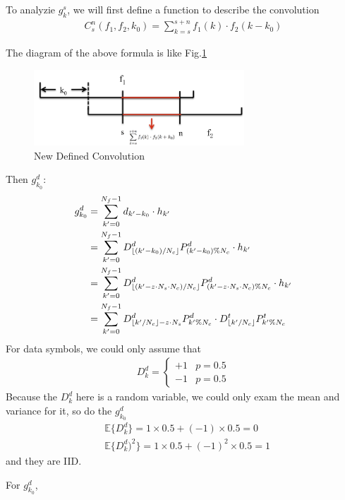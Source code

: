 \documentclass[a4paper]{article}
\DeclarePairedDelimiter\floor{\lfloor}{\rfloor}
\begin{document}
To analyzie $g^s_k$, we will first define a function to describe the convolution
\begin{align}
	C^n_s(f_1, f_2, k_0) = \sum_{k = s}^{s+n} f_1(k)\cdot f_2(k - k_0) \label{eq:New Defined Convolution}
\end{align}

The diagram of the above formula is like Fig.\ref{fig:New Defined Convolution}
\begin{figure}[ht]
	\centering
	\includegraphics[width=3.1in]{figure/conv_figure.png}
	\caption{New Defined Convolution}
	\label{fig:New Defined Convolution}
\end{figure}
Then $g^d_{k_0}$: \label{eq:perfectly aligned-data}
\begin{align}
	g^d_{k_0}
	&= \sum_{k' = 0}^{N_f-1} d_{k' - k_0} \cdot h_{k'} \\
	&= \sum_{k' = 0}^{N_f-1} D^d_{\floor{(k' - k_0)/N_c}}P^d_{(k' - k_0)\%N_c} \cdot h_{k'}\\
	&= \sum_{k' = 0}^{N_f-1} D^d_{\floor{(k' - z \cdot N_s \cdot N_c)/N_c}} P^d_{(k' - z \cdot N_s \cdot N_c)\%N_c}\cdot h_{k'}\\
	&= \sum_{k' = 0}^{N_f-1} D^d_{\floor{k'/N_c} - z \cdot N_s} P^d_{k'\%N_c} \cdot D^t_{\floor{k'/N_c}} P^t_{k' \% N_c} 
\end{align}
For data symbols, we could only assume that 
\begin{align}
	D^d_k = 
	\begin{cases}
	+1 & p = 0.5\\
	-1 & p = 0.5	
	\end{cases}
\end{align}
Because the $D^d_k$ here is a random variable, we could only exam the mean and variance for it, so do the $g^d_{k_0}$
\begin{align}
	&\mathbb{E} \{D^d_k\} = 1 \times 0.5 + (-1) \times 0.5 = 0\\
	&\mathbb{E} \{D^d_k)^2\} = 1 \times 0.5 + (-1)^2 \times 0.5 = 1
\end{align}
and they are IID.

For $g^d_{k_0}$,
\end{document}
